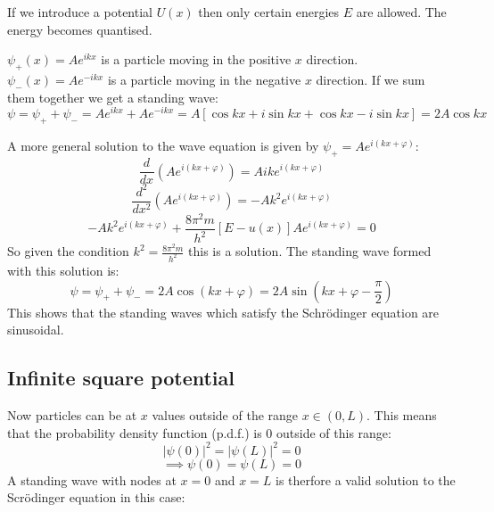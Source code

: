 \documentclass{article}
\newcommand{\diff}[2][]{\frac{d^{#1}}{d{#2}^{#1}}}
\begin{document}
\section{}

If we introduce a potential \(U(x)\) then only certain energies \(E\) are allowed. The energy becomes quantised.

\(\psi_+(x)=Ae^{ikx}\) is a particle moving in the positive \(x\) direction. \(\psi_-(x)=Ae^{-ikx}\) is a particle moving in the negative \(x\) direction. If we sum them together we get a standing wave:
\[\psi=\psi_++\psi_-=Ae^{ikx}+Ae^{-ikx}=A[\cos kx+i\sin kx+\cos kx-i\sin kx]=2A\cos kx\]

A more general solution to the wave equation is given by \(\psi_+=Ae^{i(kx+\varphi)}\):
\[\diff x (Ae^{i(kx+\varphi)})=Aike^{i(kx+\varphi)}\]
\[\diff[2] x(Ae^{i(kx+\varphi)})=-Ak^2e^{i(kx+\varphi)}\]
\[-Ak^2e^{i(kx+\varphi)}+\frac{8\pi^2m}{h^2}[E-u(x)]Ae^{i(kx+\varphi)}=0\]
So given the condition \(k^2=\frac{8\pi^2m}{h^2}\) this is a solution.
The standing wave formed with this solution is:
\[\psi=\psi_++\psi_-=2A\cos(kx+\varphi)=2A\sin\left(kx+\varphi-\frac{\pi}{2}\right)\]
This shows that the standing waves which satisfy the Schr\"odinger equation are sinusoidal.

\subsection*{Infinite square potential}

\begin{center}
\end{center}
Now particles can be at \(x\) values outside of the range \(x\in(0,L)\). This means that the probability density function (p.d.f.) is 0 outside of this range:
\[|\psi(0)|^2=|\psi(L)|^2=0\]
\[\implies\psi(0)=\psi(L)=0\]
A standing wave with nodes at \(x=0\) and \(x=L\) is therfore a valid solution to the Scr\"odinger equation in this case:
\end{document}
